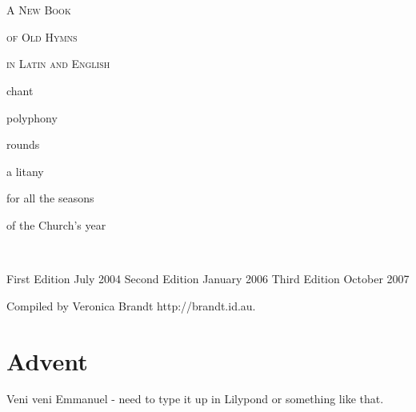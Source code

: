 \documentclass[11pt]{article} %
\begin{document}

\def\greinitialformat#1{%
{\fontsize{43}{43}\selectfont #1}%
}

\redlines


~

\bigskip

~

\begin{center}

\textsc{\huge A New Book}

\bigskip



\textsc{\huge of Old Hymns}

\bigskip


\textsc{\large in Latin and English}

\bigskip


chant

polyphony

rounds

a litany

for all the seasons

of the Church's year

\end{center}

\bigskip

\eject

~

\vfill

First Edition July 2004
Second Edition January 2006
Third Edition October 2007

Compiled by Veronica Brandt http://brandt.id.au.

\eject

\tableofcontents


\section{Advent}


Veni veni Emmanuel - need to type it up in Lilypond or something like that.
\end{document}
